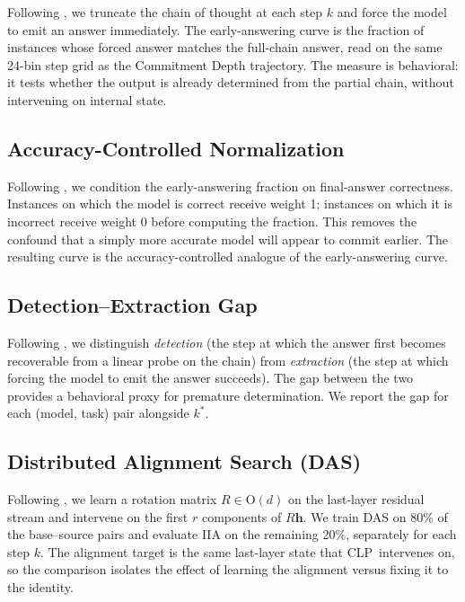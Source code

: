 \documentclass[11pt]{article}
\newcommand{\stepk}{k}
\newcommand{\CLP}{\textsc{CLP}}
\begin{document}
Following \citet{DBLP:journals/corr/abs-2307-13702}, we truncate the chain of
thought at each step $\stepk$ and force the model to emit an answer immediately.
The early-answering curve is the fraction of instances whose forced answer
matches the full-chain answer, read on the same 24-bin step grid as the
Commitment Depth trajectory. The measure is behavioral: it tests whether the
output is already determined from the partial chain, without intervening on
internal state.

\subsection{Accuracy-Controlled Normalization}
\label{app:competitors-ac}

Following \citet{DBLP:journals/tmlr/BenthamSM24}, we condition the
early-answering fraction on final-answer correctness. Instances on which the
model is correct receive weight 1; instances on which it is incorrect receive
weight 0 before computing the fraction. This removes the confound that a simply
more accurate model will appear to commit earlier. The resulting curve is the
accuracy-controlled analogue of the early-answering curve.

\subsection{Detection--Extraction Gap}
\label{app:competitors-de}

Following \citet{DBLP:journals/corr/abs-2604-06613}, we distinguish
\emph{detection} (the step at which the answer first becomes recoverable from a
linear probe on the chain) from \emph{extraction} (the step at which forcing the
model to emit the answer succeeds). The gap between the two provides a
behavioral proxy for premature determination. We report the gap for each
(model, task) pair alongside $\stepk^{*}$.

\subsection{Distributed Alignment Search (DAS)}
\label{app:competitors-das}

Following \citet{DBLP:conf/clear2/GeigerWPIG24}, we learn a rotation matrix
$R\in\mathrm{O}(d)$ on the last-layer residual stream and intervene on the first
$r$ components of $R\mathbf{h}$. We train DAS on 80\% of the base--source pairs
and evaluate IIA on the remaining 20\%, separately for each step $\stepk$. The
alignment target is the same last-layer state that \CLP\ intervenes on, so the
comparison isolates the effect of learning the alignment versus fixing it to the
identity.
\end{document}
